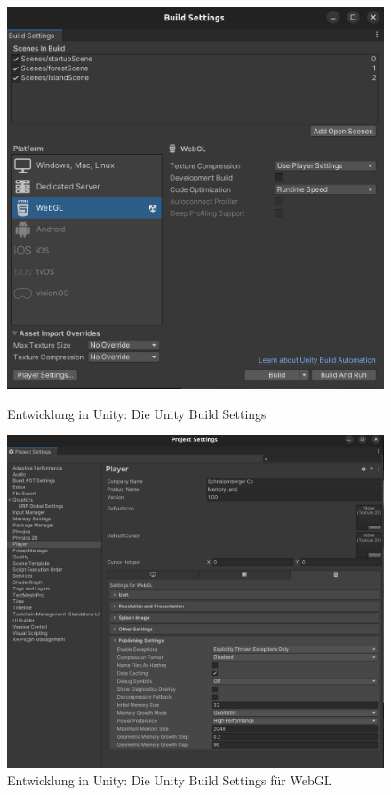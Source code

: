 \begin{figure}
    \centering
    \includegraphics[scale=0.12]{pics/unity-bulid-settings.png}
    \caption{Entwicklung in Unity: Die Unity Build Settings}
    \label{fig:unity-build-settings}

    \vspace{1cm}

    \centering
    \includegraphics[scale=0.09]{pics/unity-build-webgl-settings.png}
    \caption{Entwicklung in Unity: Die Unity Build Settings für WebGL}
    \label{fig:unity-build-webgl-settings}
\end{figure}



